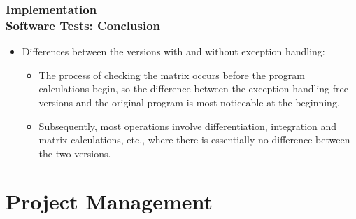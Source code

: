 \documentclass[ucs,10pt]{beamer}
\begin{document}
\begin{frame}
\frametitle{Implementation \\
	\small \color{rwth-blue} Software Tests: Conclusion}

	\begin{itemize}
		\item Differences between the versions with and without exception handling:
		\begin{itemize}
			\item The process of checking the matrix occurs before the program calculations begin, so the difference between the exception handling-free versions and the original program is most noticeable at the beginning.
			\item Subsequently, most operations involve differentiation, integration and matrix calculations, etc., where there is essentially no difference between the two versions.
		\end{itemize}
	\end{itemize}
\end{frame}



\section{Project Management}
\end{document}
